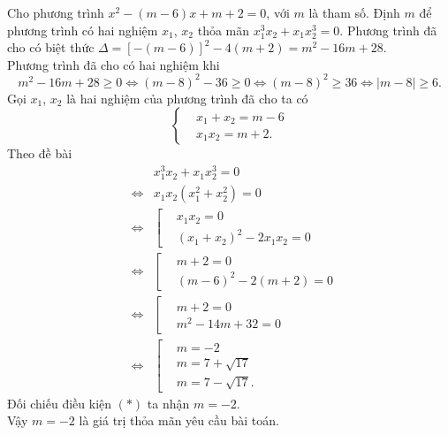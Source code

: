 \begin{bt}%
 Cho phương trình $x^2-(m-6)x+m+2=0$, với $m$ là tham số. Định $m$ để phương trình có hai nghiệm $x_1$, $x_2$ thỏa mãn $x_1^3x_2+x_1x_2^3=0$.
 \loigiai
  {
   Phương trình đã cho có biệt thức $\Delta =\left[-(m-6)\right]^2-4(m+2)=m^2-16m+28$.\\
   Phương trình đã cho có hai nghiệm khi
   \begin{equation*}
    m^2-16m+28 \geq 0 \Leftrightarrow (m-8)^2-36 \geq 0 \Leftrightarrow (m-8)^2 \geq 36 \Leftrightarrow |m-8|\geq 6. \tag{$*$}
   \end{equation*}
   Gọi $x_1$, $x_2$ là hai nghiệm của phương trình đã cho ta có
   $$\left\{\begin{aligned}&x_1+x_2=m-6 \\&x_1x_2=m+2.\end{aligned}\right.$$
   Theo đề bài
   \allowdisplaybreaks
   \begin{eqnarray*}
    & & x_1^3x_2+x_1x_2^3=0\\
    &\Leftrightarrow & x_1x_2\left(x_1^2+x_2^2\right)=0\\
    &\Leftrightarrow & \left[\begin{aligned}&x_1x_2=0 \\&(x_1+x_2)^2-2x_1x_2=0\end{aligned}\right.\\
    &\Leftrightarrow & \left[\begin{aligned}&m+2=0 \\&(m-6)^2-2(m+2)=0\end{aligned}\right.\\
    &\Leftrightarrow & \left[\begin{aligned}&m+2=0 \\&m^2-14m+32=0\end{aligned}\right.\\
    &\Leftrightarrow & \left[\begin{aligned}&m=-2 \\&m=7+\sqrt{17} \\&m=7-\sqrt{17}.\end{aligned}\right.
   \end{eqnarray*}
   Đối chiếu điều kiện $(*)$ ta nhận $m=-2$.\\
   Vậy $m=-2$ là giá trị thỏa mãn yêu cầu bài toán.
  }
\end{bt}


